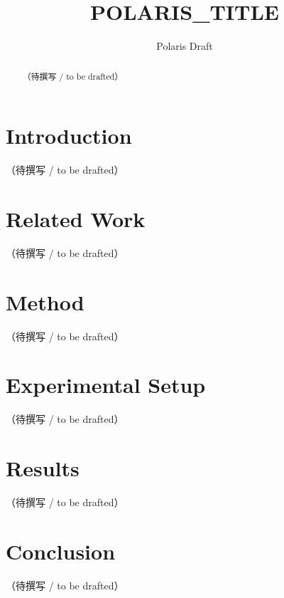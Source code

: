 \documentclass{article}
\title{{{POLARIS_TITLE}}}
\author{Polaris Draft}
\begin{document}
\maketitle

\begin{abstract}
（待撰写 / to be drafted）
\end{abstract}

\section{Introduction}
（待撰写 / to be drafted）

\section{Related Work}
（待撰写 / to be drafted）

\section{Method}
（待撰写 / to be drafted）

\section{Experimental Setup}
（待撰写 / to be drafted）

\section{Results}
（待撰写 / to be drafted）

\section{Conclusion}
（待撰写 / to be drafted）



\end{document}

